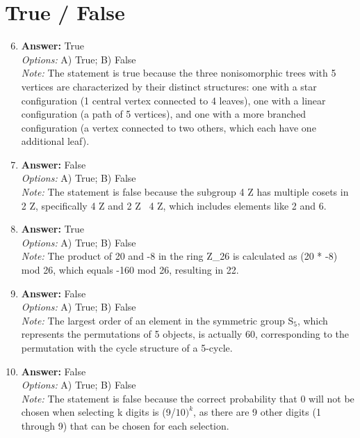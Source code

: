 \documentclass[12pt]{article}
\begin{document}
\section*{True / False}
\begin{enumerate}[label=\arabic*.]
\setcounter{enumi}{5}
\item \textbf{Answer:} True
\\ \textit{Options:} A) True; B) False
\\ \textit{Note:} The statement is true because the three nonisomorphic trees with 5 vertices are characterized by their distinct structures: one with a star configuration (1 central vertex connected to 4 leaves), one with a linear configuration (a path of 5 vertices), and one with a more branched configuration (a vertex connected to two others, which each have one additional leaf).
\item \textbf{Answer:} False
\\ \textit{Options:} A) True; B) False
\\ \textit{Note:} The statement is false because the subgroup 4 Z has multiple cosets in 2 Z, specifically 4 Z and 2 Z \ 4 Z, which includes elements like 2 and 6.
\item \textbf{Answer:} True
\\ \textit{Options:} A) True; B) False
\\ \textit{Note:} The product of 20 and -8 in the ring Z\_26 is calculated as (20 * -8) mod 26, which equals -160 mod 26, resulting in 22.
\item \textbf{Answer:} False
\\ \textit{Options:} A) True; B) False
\\ \textit{Note:} The largest order of an element in the symmetric group S$_{5}$, which represents the permutations of 5 objects, is actually 60, corresponding to the permutation with the cycle structure of a 5-cycle.
\item \textbf{Answer:} False
\\ \textit{Options:} A) True; B) False
\\ \textit{Note:} The statement is false because the correct probability that 0 will not be chosen when selecting k digits is (9/$10)^k$, as there are 9 other digits (1 through 9) that can be chosen for each selection.
\end{enumerate}
\end{document}
